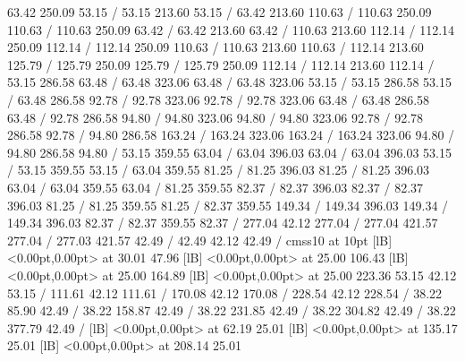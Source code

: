 { 63.42 250.09 53.15 /
 53.15 213.60 53.15 /
\setsolid
{} 63.42 213.60 110.63 /
 110.63 250.09 110.63 /
 110.63 250.09 63.42 /
 63.42 213.60 63.42 /
\setsolid
{} 110.63 213.60 112.14 /
 112.14 250.09 112.14 /
 112.14 250.09 110.63 /
 110.63 213.60 110.63 /
\setsolid
{} 112.14 213.60 125.79 /
 125.79 250.09 125.79 /
 125.79 250.09 112.14 /
 112.14 213.60 112.14 /
\setsolid
{} 53.15 286.58 63.48 /
 63.48 323.06 63.48 /
 63.48 323.06 53.15 /
 53.15 286.58 53.15 /
\setsolid
{} 63.48 286.58 92.78 /
 92.78 323.06 92.78 /
 92.78 323.06 63.48 /
 63.48 286.58 63.48 /
\setsolid
{} 92.78 286.58 94.80 /
 94.80 323.06 94.80 /
 94.80 323.06 92.78 /
 92.78 286.58 92.78 /
\setsolid
{} 94.80 286.58 163.24 /
 163.24 323.06 163.24 /
 163.24 323.06 94.80 /
 94.80 286.58 94.80 /
\setsolid
{} 53.15 359.55 63.04 /
 63.04 396.03 63.04 /
 63.04 396.03 53.15 /
 53.15 359.55 53.15 /
\setsolid
{} 63.04 359.55 81.25 /
 81.25 396.03 81.25 /
 81.25 396.03 63.04 /
 63.04 359.55 63.04 /
\setsolid
{} 81.25 359.55 82.37 /
 82.37 396.03 82.37 /
 82.37 396.03 81.25 /
 81.25 359.55 81.25 /
\setsolid
{} 82.37 359.55 149.34 /
 149.34 396.03 149.34 /
 149.34 396.03 82.37 /
 82.37 359.55 82.37 /
\setsolid
{} 277.04 42.12 277.04 /
 277.04 421.57 277.04 /
 277.03 421.57 42.49 /
 42.49 42.12 42.49 /
\font\picfont cmss10 at 10pt\picfont
{}  [lB] <0.00pt,0.00pt> at 30.01 47.96
  [lB] <0.00pt,0.00pt> at 25.00 106.43
  [lB] <0.00pt,0.00pt> at 25.00 164.89
  [lB] <0.00pt,0.00pt> at 25.00 223.36
\setsolid
{} 53.15 42.12 53.15 /
\setsolid
{} 111.61 42.12 111.61 /
\setsolid
{} 170.08 42.12 170.08 /
\setsolid
{} 228.54 42.12 228.54 /
\setsolid
{} 38.22 85.90 42.49 /
\setsolid
{} 38.22 158.87 42.49 /
\setsolid
{} 38.22 231.85 42.49 /
\setsolid
{} 38.22 304.82 42.49 /
\setsolid
{} 38.22 377.79 42.49 /
  [lB] <0.00pt,0.00pt> at 62.19 25.01
  [lB] <0.00pt,0.00pt> at 135.17 25.01
  [lB] <0.00pt,0.00pt> at 208.14 25.01
}

